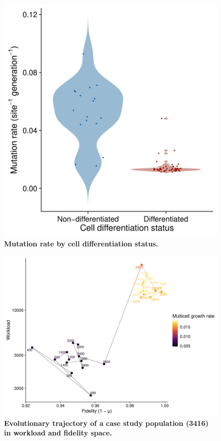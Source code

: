 \documentclass[
]{book}
\begin{document}
\begin{figure}
\centering
\includegraphics{images/Mutation_rate_by_cell_differentation_status_27JULY20.png}
\caption{\label{fig:mutation-rates}\textbf{Mutation rate by cell differentiation status.}}
\end{figure}

\begin{figure}
\centering
\includegraphics{images/Workload_by_fidelity_case_study_3416_30JULY20.png}
\caption{\label{fig:case-study-over-time-mutation-rates}\textbf{Evolutionary trajectory of a case study population (3416) in workload and fidelity space.}}
\end{figure}
\end{document}
